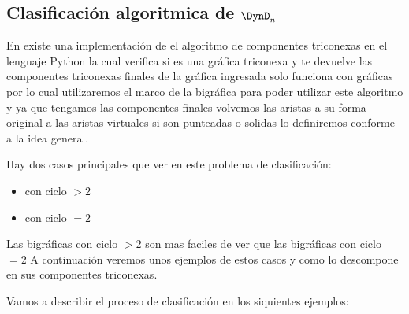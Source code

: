 \subsection{Clasificación algoritmica de $\DynD_{n}$}
En \citep{TricLinTimAlg} existe una implementación de el algoritmo de componentes triconexas en el lenguaje Python la cual verifica si es una gráfica triconexa y te devuelve las componentes triconexas finales de la gráfica ingresada solo funciona con gráficas por lo cual utilizaremos el marco de la bigráfica para poder utilizar este algoritmo y ya que tengamos las componentes finales volvemos las aristas a su forma original a las aristas virtuales si son punteadas o solidas lo definiremos conforme a la idea general.

Hay dos casos principales que ver en este problema de clasificación:
\begin{itemize}
 \item con ciclo $>2$
 \item con ciclo $=2$
\end{itemize}

Las bigráficas con ciclo $> 2$ son mas faciles de ver que las bigráficas con ciclo $= 2$ A continuación veremos unos ejemplos de estos casos y como \citep{TricLinTimAlg} lo descompone en sus componentes triconexas.

Vamos a describir el proceso de clasificación en los siquientes ejemplos:

